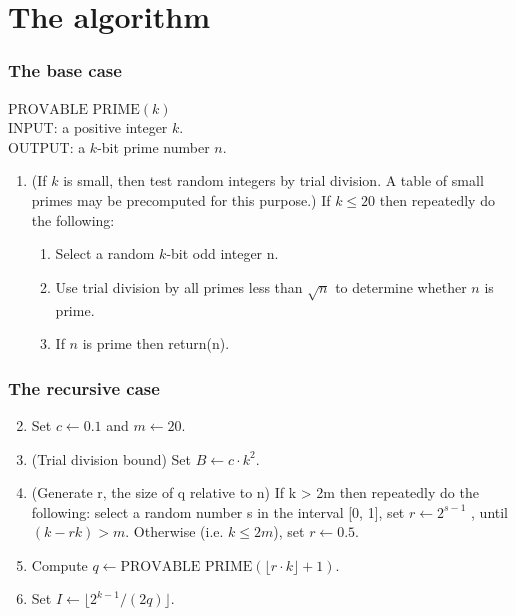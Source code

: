 \documentclass{beamer}
\begin{document}
\section{The algorithm}
\begin{frame}
\frametitle{The base case}
\noindent
$\text{PROVABLE PRIME}(k)$\\
INPUT: a positive integer $k$.\\
OUTPUT: a $k$-bit prime number $n$.
\begin{enumerate}
\item (If $k$ is small, then test random integers by trial division. A table of small primes may 
be precomputed for this purpose.) 
If $k \leq 20$ then repeatedly do the following: 
\begin{enumerate}
\item Select a random $k$-bit odd integer n. 
\item Use trial division by all primes less than $\sqrt{n}$ to determine whether $n$ is prime. 
\item If $n$ is prime then return(n).
\end{enumerate}
\end{enumerate}
\end{frame}
\begin{frame}
\frametitle{The recursive case}
\begin{enumerate}

  \setcounter{enumi}{1}
\item Set $c\leftarrow 0.1$ and $m\leftarrow 20$. 
\item (Trial division bound) Set $B\leftarrow c \cdot k^2$. 
\item (Generate r, the size of q relative to n) If k > 2m then repeatedly 
do the following: select a random number s in the interval [0, 1], set $r\leftarrow 2^{s-1}$ , until 
$(k - rk) > m$. Otherwise (i.e. $k \leq 2m$), set $r\leftarrow 0.5$. 
\item Compute $q\leftarrow \text{PROVABLE PRIME}(\lfloor r \cdot k \rfloor + 1)$. 
\item Set $I \leftarrow \lfloor 2^{k-1} /(2q) \rfloor$.
\end{enumerate} 
\end{frame}
\end{document}
